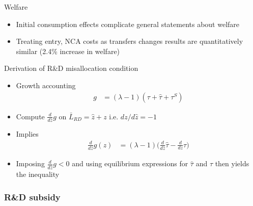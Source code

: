 \documentclass[english,usenames,dvipsnames]{beamer}
\begin{document}
\begin{frame}{Welfare}\label{welfare_varyingKappaC}
	\begin{itemize}
		\item Initial consumption effects complicate general statements about welfare \hyperlink{welfare_details}{}
		\item Treating entry, NCA costs as transfers changes results are quantitatively similar (2.4\% increase in welfare) \hyperlink{welfare_costsAreTransfers}{}
	\end{itemize}
\end{frame}

\begin{frame}{Derivation of R\&D misallocation condition}\label{misallocation_of_rd:derivation}
	\hyperlink{misallocation_of_rd}{}
	\begin{itemize}
		\item Growth accounting
		\begin{align*}
			g &= (\lambda - 1) (\tau + \hat{\tau} + \tau^S)
		\end{align*}
		\item Compute $\frac{d}{d\hat{z}} g$ on $\bar{L}_{RD} = \hat{z} + z$ i.e. $dz /d\hat{z} = -1$
		\item Implies
		\begin{align}
			\frac{d}{d\hat{z}} g(z) &= (\lambda -1) \Big(\frac{d}{d\hat{z}} \hat{\tau} - \frac{d}{dz} \tau \Big)
		\end{align}
		\item Imposing $\frac{d}{d\hat{z}} g < 0$ and using equilibrium expressions for $\hat{\tau}$ and $\tau$ then yields the inequality
	\end{itemize}
\end{frame}

\subsubsection{R\&D subsidy}
\end{document}
